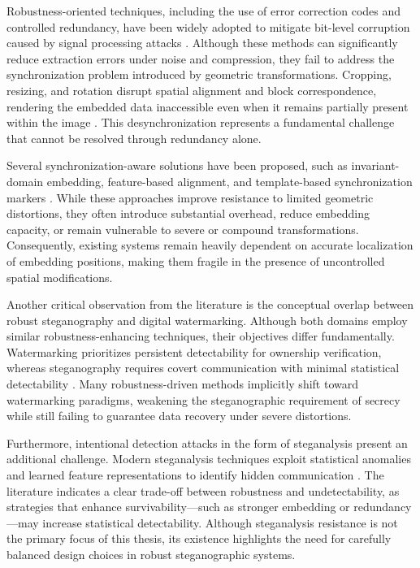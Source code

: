 \documentclass[12pt,a4paper,oneside]{report}
\begin{document}
	Robustness-oriented techniques, including the use of error correction codes and controlled redundancy, have been widely adopted to mitigate bit-level corruption caused by signal processing attacks \cite{cox2007digital}. Although these methods can significantly reduce extraction errors under noise and compression, they fail to address the synchronization problem introduced by geometric transformations. Cropping, resizing, and rotation disrupt spatial alignment and block correspondence, rendering the embedded data inaccessible even when it remains partially present within the image \cite{Piva2002}. This desynchronization represents a fundamental challenge that cannot be resolved through redundancy alone.
	
	Several synchronization-aware solutions have been proposed, such as invariant-domain embedding, feature-based alignment, and template-based synchronization markers \cite{ruanaidh1998rotation}. While these approaches improve resistance to limited geometric distortions, they often introduce substantial overhead, reduce embedding capacity, or remain vulnerable to severe or compound transformations. Consequently, existing systems remain heavily dependent on accurate localization of embedding positions, making them fragile in the presence of uncontrolled spatial modifications.
	
	Another critical observation from the literature is the conceptual overlap between robust steganography and digital watermarking. Although both domains employ similar robustness-enhancing techniques, their objectives differ fundamentally. Watermarking prioritizes persistent detectability for ownership verification, whereas steganography requires covert communication with minimal statistical detectability \cite{cox2007digital,provos2003hide}. Many robustness-driven methods implicitly shift toward watermarking paradigms, weakening the steganographic requirement of secrecy while still failing to guarantee data recovery under severe distortions.
	
	Furthermore, intentional detection attacks in the form of steganalysis present an additional challenge. Modern steganalysis techniques exploit statistical anomalies and learned feature representations to identify hidden communication \cite{Fridrich2012}. The literature indicates a clear trade-off between robustness and undetectability, as strategies that enhance survivability—such as stronger embedding or redundancy—may increase statistical detectability. Although steganalysis resistance is not the primary focus of this thesis, its existence highlights the need for carefully balanced design choices in robust steganographic systems.
	
\end{document}
